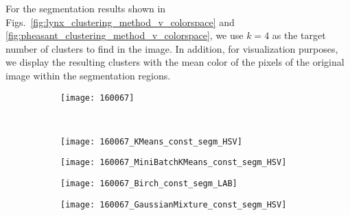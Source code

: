 For the segmentation results shown in Figs.\ \ref{fig:lynx_clustering_method_v_colorspace} and \ref{fig:pheasant_clustering_method_v_colorspace}, we use $k = 4$ as the target number of clusters to find in the image. In addition, for visualization purposes, we display the resulting clusters with the mean color of the pixels of the original image within the segmentation regions. 

\begin{figure}[!ht]
         
    \begin{subfigure}[b]{\textwidth+20pt\relax}
    	\centering
    	\texttt{[image: 160067]} 
    \end{subfigure}  \\ \vspace{-5pt}    
    
    
    \begin{subfigure}[b]{\textwidth+20pt\relax}
    	\centering
    	\texttt{[image: 160067\_KMeans\_const\_segm\_HSV]} 
    \end{subfigure}      
    \begin{subfigure}[b]{0.23\textwidth}
    	\centering
        \texttt{[image: 160067\_MiniBatchKMeans\_const\_segm\_HSV]}
    \end{subfigure}
    \begin{subfigure}[b]{0.23\textwidth}
    	\centering
        \texttt{[image: 160067\_Birch\_const\_segm\_LAB]}
    \end{subfigure}
    \begin{subfigure}[b]{0.23\textwidth}
    	\centering
        \texttt{[image: 160067\_GaussianMixture\_const\_segm\_HSV]}
    \end{subfigure} \\ \vspace{-5pt}  
    

\end{figure}
